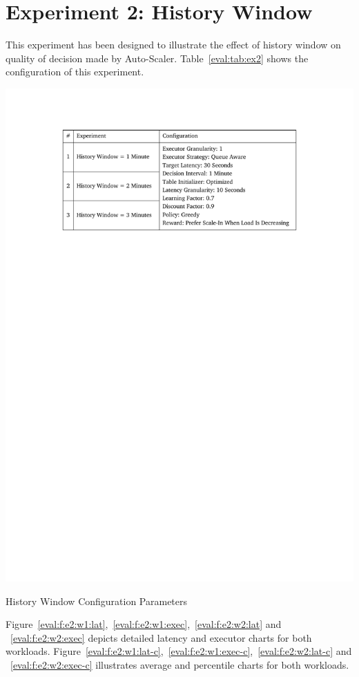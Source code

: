 \section{Experiment 2: History Window}
This experiment has been designed to illustrate the effect of history window on quality of decision made by Auto-Scaler. Table~\ref{eval:tab:ex2} shows the configuration of this experiment.
\begin{table}[h]
    \includegraphics[clip,trim=3.3cm 21.18cm 3.25cm 2.5cm]{tables/ex2.pdf}
    \centering
    \caption{History Window Configuration Parameters}
    \label{eval:tab:ex2}
\end{table}

Figure~\ref{eval:f:e2:w1:lat},~\ref{eval:f:e2:w1:exec},~\ref{eval:f:e2:w2:lat} and ~\ref{eval:f:e2:w2:exec} depicts detailed latency and executor charts for both workloads. Figure~\ref{eval:f:e2:w1:lat-c},~\ref{eval:f:e2:w1:exec-c},~\ref{eval:f:e2:w2:lat-c} and ~\ref{eval:f:e2:w2:exec-c} illustrates average and percentile charts for both workloads.

